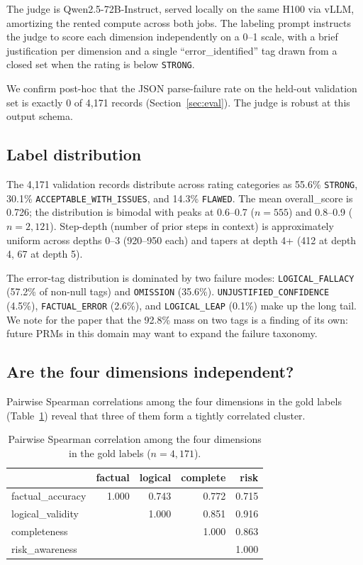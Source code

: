 \documentclass[10pt,letterpaper]{article}
\begin{document}
The judge is Qwen2.5-72B-Instruct, served locally on the same H100 via vLLM, amortizing the rented compute across both jobs. The labeling prompt instructs the judge to score each dimension independently on a 0--1 scale, with a brief justification per dimension and a single ``error\_identified'' tag drawn from a closed set when the rating is below \texttt{STRONG}.

We confirm post-hoc that the JSON parse-failure rate on the held-out validation set is exactly 0 of 4{,}171 records (Section~\ref{sec:eval}). The judge is robust at this output schema.

\subsection{Label distribution}

The 4{,}171 validation records distribute across rating categories as 55.6\% \texttt{STRONG}, 30.1\% \texttt{ACCEPTABLE\_WITH\_ISSUES}, and 14.3\% \texttt{FLAWED}. The mean overall\_score is 0.726; the distribution is bimodal with peaks at 0.6--0.7 ($n=555$) and 0.8--0.9 ($n=2{,}121$). Step-depth (number of prior steps in context) is approximately uniform across depths 0--3 (920--950 each) and tapers at depth 4+ (412 at depth 4, 67 at depth 5).

The error-tag distribution is dominated by two failure modes: \texttt{LOGICAL\_FALLACY} (57.2\% of non-null tags) and \texttt{OMISSION} (35.6\%). \texttt{UNJUSTIFIED\_CONFIDENCE} (4.5\%), \texttt{FACTUAL\_ERROR} (2.6\%), and \texttt{LOGICAL\_LEAP} (0.1\%) make up the long tail. We note for the paper that the 92.8\% mass on two tags is a finding of its own: future PRMs in this domain may want to expand the failure taxonomy.

\subsection{Are the four dimensions independent?}
\label{sec:orthogonality}

Pairwise Spearman correlations among the four dimensions in the gold labels (Table~\ref{tab:orth}) reveal that three of them form a tightly correlated cluster.

\begin{table}[!ht]
\centering
\small
\caption{Pairwise Spearman correlation among the four dimensions in the gold labels ($n = 4{,}171$).}
\label{tab:orth}
\begin{tabular}{lrrrr}
\toprule
 & factual & logical & complete & risk \\
\midrule
factual\_accuracy   & 1.000 & 0.743 & 0.772 & 0.715 \\
logical\_validity   &       & 1.000 & 0.851 & 0.916 \\
completeness        &       &       & 1.000 & 0.863 \\
risk\_awareness     &       &       &       & 1.000 \\
\bottomrule
\end{tabular}
\end{table}
\end{document}
